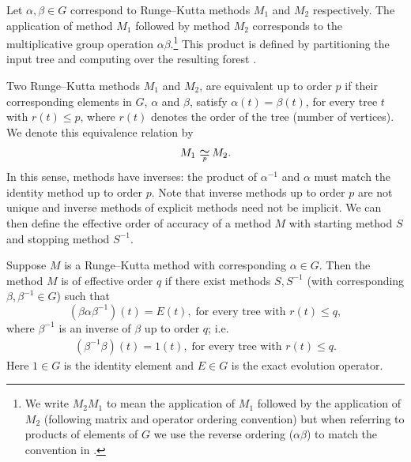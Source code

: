 \documentclass[final]{siamltex}  %
\begin{document}
Let $\alpha, \beta \in G$ correspond to Runge--Kutta methods $M_1$ and $M_2$
respectively.
The application of method $M_1$ followed by method $M_2$ corresponds to
the multiplicative group operation $\alpha\beta$.\footnote{We write
	$M_2M_1$ to mean the application of $M_1$
	followed by the application of $M_2$
	(following matrix and operator ordering convention)
	but when referring to products of elements of $G$
        we use the reverse ordering ($\alpha\beta$)
	to match the convention in \cite{Butcher2008_book}.}
This product is defined by partitioning the input tree and computing
over the resulting forest \cite[\S~383]{Butcher2008_book}.

Two Runge--Kutta methods $M_1$ and $M_2$, are equivalent up to order
$p$ if their corresponding elements in $G$, $\alpha$ and $\beta$, satisfy
$\alpha(t) = \beta(t)$, for every tree $t$ with $r(t) \leq p$,
where $r(t)$ denotes the order of the tree (number of vertices).
We denote this equivalence relation by
$$M_1 \equival{p} M_2.$$
In this sense, methods have inverses: the product of $\alpha^{-1}$ and
$\alpha$ must match the identity method up to order $p$.
Note that inverse methods up to order $p$ are not unique and inverse 
methods of explicit methods need not be implicit.
We can then define the effective order of accuracy of a method $M$
with starting method $S$ and stopping method $S^{-1}$. %
\begin{definition}\cite[\S~389]{Butcher2008_book}\label{def:Effective_order}
  Suppose $M$ is a Runge--Kutta method with corresponding $\alpha \in G$.
  Then the method $M$ is of effective order $q$ if there exist methods
  $S,S^{-1}$ (with corresponding $\beta, \beta^{-1} \in G$) such that
	\begin{equation}\label{eq:Effective_order_1}
		(\beta\alpha\beta^{-1})(t) = E(t), \; \text{for every tree with } r(t) \leq q,
	\end{equation}
        where $\beta^{-1}$ is an inverse of $\beta$ up to order $q$; i.e.
        \begin{align*}
        		(\beta^{-1}\beta)(t) = 1(t), \; \text{for every tree with } r(t) \leq q.
		\end{align*}	        
        Here $1\in G$ is the identity element
        and $E\in G$ is the exact evolution operator.
\end{definition}
\end{document}
